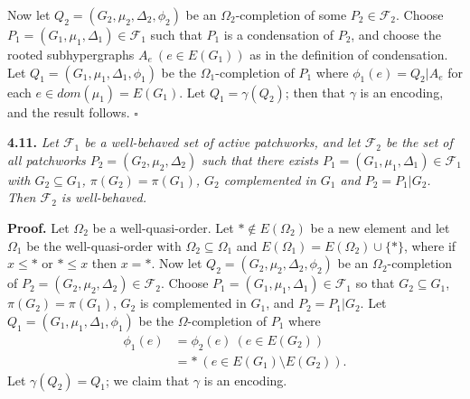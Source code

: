 Now let $Q_2 = (G_2, \mu_2, \Delta_2, \phi_2)$ be an $\Omega_2$-completion of some $P_2 \in \mathcal{F}_2$. Choose $P_1 = (G_1, \mu_1, \Delta_1) \in \mathcal{F}_1$ such that $P_1$ is a condensation of $P_2$, and choose the rooted subhypergraphs $A_e\ (e \in E(G_1))$ as in the definition of condensation. Let $Q_1 = (G_1, \mu_1, \Delta_1, \phi_1)$ be the $\Omega_1$-completion of $P_1$ where $\phi_1(e) = Q_2|A_e$ for each $e \in dom(\mu_1) = E(G_1)$. Let $Q_1 = \gamma(Q_2)$; then   that $\gamma$ is an encoding, and the result follows. $\square$

\textbf{4.11.} \textit{Let $\mathcal{F}_1$ be a well-behaved set of active patchworks, and let $\mathcal{F}_2$ be the set of all patchworks $P_2 = (G_2, \mu_2, \Delta_2)$ such that there exists $P_1 = (G_1, \mu_1, \Delta_1) \in \mathcal{F}_1$ with $G_2 \subseteq G_1$, $\pi(G_2) = \pi(G_1)$, $G_2$ complemented in $G_1$ and $P_2 = P_1|G_2$. Then $\mathcal{F}_2$ is well-behaved.}

\textbf{Proof.} Let $\Omega_2$ be a well-quasi-order. Let $* \notin E(\Omega_2)$ be a new element and let $\Omega_1$ be the well-quasi-order with $\Omega_2 \subseteq \Omega_1$ and $E(\Omega_1) = E(\Omega_2) \cup \{*\}$, where if $x \le *$ or $* \le x$ then $x = *$. Now let $Q_2 = (G_2, \mu_2, \Delta_2, \phi_2)$ be an $\Omega_2$-completion of $P_2 = (G_2, \mu_2, \Delta_2) \in \mathcal{F}_2$. Choose $P_1 = (G_1, \mu_1, \Delta_1) \in \mathcal{F}_1$ so that $G_2 \subseteq G_1$, $\pi(G_2) = \pi(G_1)$, $G_2$ is complemented in $G_1$, and $P_2 = P_1|G_2$. Let $Q_1 = (G_1, \mu_1, \Delta_1, \phi_1)$ be the $\Omega$-completion of $P_1$ where
\begin{align*}
\phi_1(e) &= \phi_2(e)\ (e \in E(G_2)) \\
&= *\ (e \in E(G_1) \setminus E(G_2)).
\end{align*}
Let $\gamma(Q_2) = Q_1$; we claim that $\gamma$ is an encoding.
